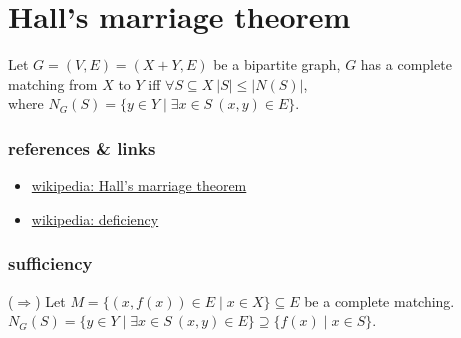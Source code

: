 \documentclass{article}
\begin{document}
\tableofcontents

\newpage
\section{Hall's marriage theorem}
Let $G=(V,E)=(X+Y,E)$ be a bipartite graph, $G$ has a complete matching from $X$ to $Y$ iff $\forall S\subseteq X\ |S|\leq |N(S)|$,\\
where $N_G(S)=\{y\in Y\mid \exists x\in S\ (x,y)\in E\}$.

\subsubsection{references \& links}

\begin{itemize}
	\item \href{https://en.wikipedia.org/wiki/Hall's_marriage_theorem}{wikipedia: Hall's marriage theorem}
	\item \href{https://en.wikipedia.org/wiki/Deficiency_(graph_theory)}{wikipedia: deficiency}
\end{itemize}


\subsubsection{sufficiency}
($\Rightarrow$)\quad
Let $M=\{(x,f(x))\in E\mid x\in X\}\subseteq E$ be a complete matching.\\
$N_G(S)=\{y\in Y\mid \exists x\in S\ (x,y)\in E\}\supseteq \{f(x)\mid x\in S\}$.
\end{document}
